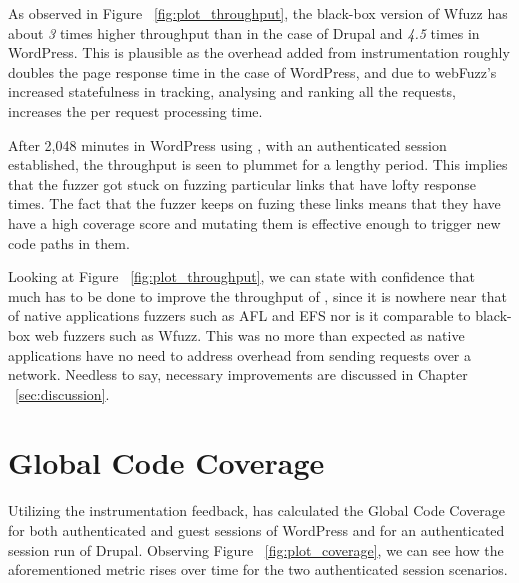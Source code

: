 As observed in Figure ~\ref{fig:plot_throughput}, the black-box version of Wfuzz has about \emph{3} times higher throughput than \pname{} in the case of Drupal and \emph{4.5} times in WordPress. This is plausible as the overhead added from instrumentation roughly doubles the page response time in the case of WordPress, and due to webFuzz's increased statefulness in tracking, analysing and ranking all the requests, increases the per request processing time.

After 2,048 minutes in WordPress using \pname{}, with an authenticated session established, the throughput is seen to plummet for a lengthy period. This implies that the fuzzer got stuck on fuzzing particular links that have lofty response times. The fact that the fuzzer keeps on fuzing these links means that they have have a high coverage score and mutating them is effective enough to trigger new code paths in them.

Looking at Figure ~\ref{fig:plot_throughput}, we can state with confidence that much has to be done to improve the throughput of \pname{}, since it is nowhere near that of native applications fuzzers such as AFL and EFS nor is it comparable to black-box web fuzzers such as Wfuzz. This was no more than expected as native applications have no need to address overhead from sending requests over a network. Needless to say, necessary improvements are discussed in Chapter ~\ref{sec:discussion}.

\section{Global Code Coverage}
Utilizing the instrumentation feedback, \pname{} has calculated the Global Code Coverage for both authenticated and guest sessions of WordPress and for an authenticated session run of Drupal. Observing Figure ~\ref{fig:plot_coverage}, we can see how the aforementioned metric rises over time for the two authenticated session scenarios.

